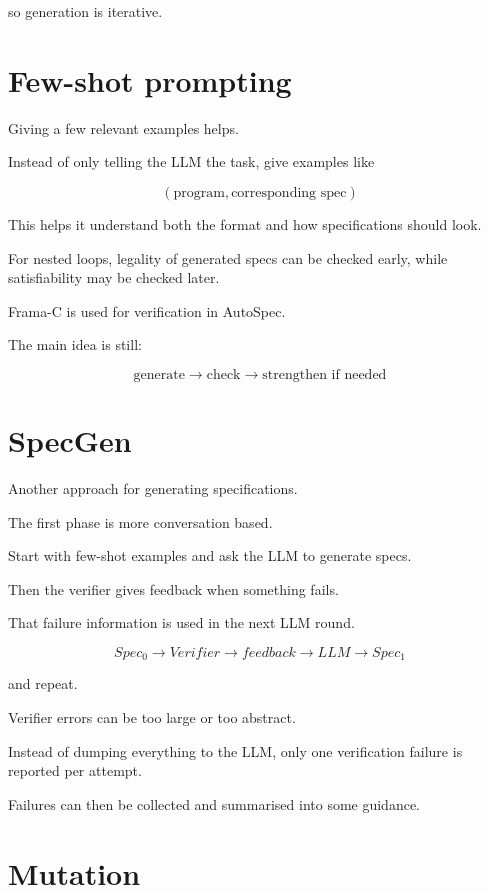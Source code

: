 \documentclass[11pt]{book}
\begin{document}
so generation is iterative.

\section{Few-shot prompting}

Giving a few relevant examples helps.

Instead of only telling the LLM the task,
give examples like

\[
(\text{program},\text{corresponding spec})
\]

This helps it understand both the format and
how specifications should look.

For nested loops, legality of generated specs can
be checked early, while satisfiability may be
checked later.

Frama-C is used for verification in AutoSpec.

The main idea is still:

\[
\text{generate}
\rightarrow
\text{check}
\rightarrow
\text{strengthen if needed}
\]

\section{SpecGen}

Another approach for generating specifications.

The first phase is more conversation based.

Start with few-shot examples and ask the LLM to
generate specs.

Then the verifier gives feedback when something fails.

That failure information is used in the next
LLM round.

\[
Spec_0
\rightarrow
Verifier
\rightarrow
feedback
\rightarrow
LLM
\rightarrow
Spec_1
\]

and repeat.

\begin{ppnote}
Verifier errors can be too large or too abstract.

Instead of dumping everything to the LLM,
only one verification failure is reported per attempt.

Failures can then be collected and summarised into
some guidance.
\end{ppnote}

\section{Mutation}
\end{document}
